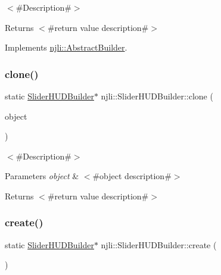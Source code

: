 $<$\#\+Description\#$>$

\begin{DoxyReturn}{Returns}
$<$\#return value description\#$>$ 
\end{DoxyReturn}


Implements \mbox{\hyperlink{classnjli_1_1_abstract_builder_aa1d220053e182c37b31b427499c6eacf}{njli\+::\+Abstract\+Builder}}.

\mbox{\label{classnjli_1_1_slider_h_u_d_builder_a71991a7d0a5a1058f1c7a381cb03cb2f}} 
\subsubsection{\texorpdfstring{clone()}{clone()}}
{\footnotesize\ttfamily static \mbox{\hyperlink{classnjli_1_1_slider_h_u_d_builder}{Slider\+H\+U\+D\+Builder}}$\ast$ njli\+::\+Slider\+H\+U\+D\+Builder\+::clone (\begin{DoxyParamCaption}\item[{const \mbox{\hyperlink{classnjli_1_1_slider_h_u_d_builder}{Slider\+H\+U\+D\+Builder}} \&}]{object }\end{DoxyParamCaption})\hspace{0.3cm}{\ttfamily [static]}}

$<$\#\+Description\#$>$


\begin{DoxyParams}{Parameters}
{\em object} & $<$\#object description\#$>$\\
\hline
\end{DoxyParams}
\begin{DoxyReturn}{Returns}
$<$\#return value description\#$>$ 
\end{DoxyReturn}
\mbox{\label{classnjli_1_1_slider_h_u_d_builder_a7445624612c77a91979b4613745aeff0}} 
\subsubsection{\texorpdfstring{create()}{create()}}
{\footnotesize\ttfamily static \mbox{\hyperlink{classnjli_1_1_slider_h_u_d_builder}{Slider\+H\+U\+D\+Builder}}$\ast$ njli\+::\+Slider\+H\+U\+D\+Builder\+::create (\begin{DoxyParamCaption}{ }\end{DoxyParamCaption})\hspace{0.3cm}{\ttfamily [static]}}

